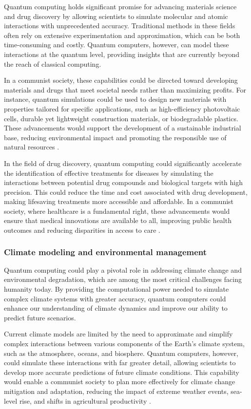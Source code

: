 Quantum computing holds significant promise for advancing materials science and drug discovery by allowing scientists to simulate molecular and atomic interactions with unprecedented accuracy. Traditional methods in these fields often rely on extensive experimentation and approximation, which can be both time-consuming and costly. Quantum computers, however, can model these interactions at the quantum level, providing insights that are currently beyond the reach of classical computing.

In a communist society, these capabilities could be directed toward developing materials and drugs that meet societal needs rather than maximizing profits. For instance, quantum simulations could be used to design new materials with properties tailored for specific applications, such as high-efficiency photovoltaic cells, durable yet lightweight construction materials, or biodegradable plastics. These advancements would support the development of a sustainable industrial base, reducing environmental impact and promoting the responsible use of natural resources \cite[pp.~1704-1707]{AspuruGuzik2005}.

In the field of drug discovery, quantum computing could significantly accelerate the identification of effective treatments for diseases by simulating the interactions between potential drug compounds and biological targets with high precision. This could reduce the time and cost associated with drug development, making lifesaving treatments more accessible and affordable. In a communist society, where healthcare is a fundamental right, these advancements would ensure that medical innovations are available to all, improving public health outcomes and reducing disparities in access to care \cite[pp.~174111]{Rungger2016}.

\subsubsection{Climate modeling and environmental management}

Quantum computing could play a pivotal role in addressing climate change and environmental degradation, which are among the most critical challenges facing humanity today. By providing the computational power needed to simulate complex climate systems with greater accuracy, quantum computers could enhance our understanding of climate dynamics and improve our ability to predict future scenarios.

Current climate models are limited by the need to approximate and simplify complex interactions between various components of the Earth's climate system, such as the atmosphere, oceans, and biosphere. Quantum computers, however, could simulate these interactions with far greater detail, allowing scientists to develop more accurate predictions of future climate conditions. This capability would enable a communist society to plan more effectively for climate change mitigation and adaptation, reducing the impact of extreme weather events, sea-level rise, and shifts in agricultural productivity \cite[pp.~631-633]{Lloyd2014}.

